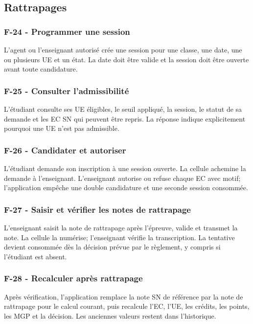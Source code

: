 \documentclass[11pt,a4paper]{article}
\newcommand{\req}[3]{\subsubsection*{#1 - #2}\noindent #3\par\medskip}
\begin{document}
\subsection{Rattrapages}
\req{F-24}{Programmer une session}{L'agent ou l'enseignant autorisé crée une session pour une classe, une date, une ou plusieurs UE et un état. La date doit être valide et la session doit être ouverte avant toute candidature.}
\req{F-25}{Consulter l'admissibilité}{L'étudiant consulte ses UE éligibles, le seuil appliqué, la session, le statut de sa demande et les EC SN qui peuvent être repris. La réponse indique explicitement pourquoi une UE n'est pas admissible.}
\req{F-26}{Candidater et autoriser}{L'étudiant demande son inscription à une session ouverte. La cellule achemine la demande à l'enseignant. L'enseignant autorise ou refuse chaque EC avec motif; l'application empêche une double candidature et une seconde session consommée.}
\req{F-27}{Saisir et vérifier les notes de rattrapage}{L'enseignant saisit la note de rattrapage après l'épreuve, valide et transmet la note. La cellule la numérise; l'enseignant vérifie la transcription. La tentative devient consommée dès la décision prévue par le règlement, y compris si l'étudiant est absent.}
\req{F-28}{Recalculer après rattrapage}{Après vérification, l'application remplace la note SN de référence par la note de rattrapage pour le calcul courant, puis recalcule l'EC, l'UE, les crédits, les points, les MGP et la décision. Les anciennes valeurs restent dans l'historique.}
\end{document}
